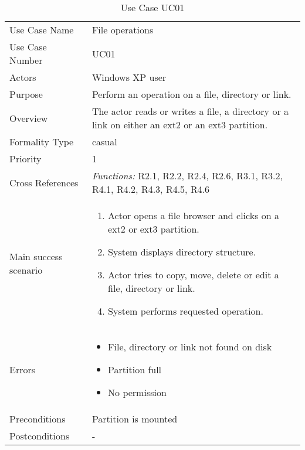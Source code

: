 \begin{longtable}{|p{4cm} X|}
\caption{\label{tab:useCase01}Use Case UC01}\\

\hline
Use Case Name 					&File operations\\
Use Case Number					&UC01\\
Actors							&Windows XP user\\
Purpose							&Perform an operation on a file, directory or link.\\
Overview						&The actor reads or writes a file, a directory or a link on either an ext2 or an ext3 partition.\\
Formality Type							&casual\\
Priority						&1\\
Cross References				&\textit{Functions:} R2.1, R2.2, R2.4, R2.6, R3.1, R3.2, R4.1, R4.2, R4.3, R4.5, R4.6\\ 
Main success scenario	&
\begin{enumerate}
\item Actor opens a file browser and clicks on a ext2 or ext3 partition.
\item System displays directory structure.
\item Actor tries to copy, move, delete or edit a file, directory or link.
\item System performs requested operation.
\end{enumerate}
\\
Errors							&\begin{itemize}
								 \item File, directory or link not found on disk
								 \item Partition full
								 \item No permission
								 \end{itemize}\\
Preconditions					&Partition is mounted\\
Postconditions					&-\\
\hline
\end{longtable}
